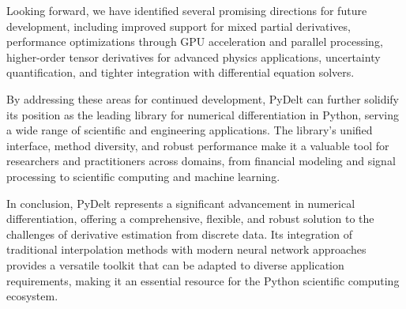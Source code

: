 \documentclass[11pt,a4paper]{article}
\begin{document}
Looking forward, we have identified several promising directions for future development, including improved support for mixed partial derivatives, performance optimizations through GPU acceleration and parallel processing, higher-order tensor derivatives for advanced physics applications, uncertainty quantification, and tighter integration with differential equation solvers.

By addressing these areas for continued development, PyDelt can further solidify its position as the leading library for numerical differentiation in Python, serving a wide range of scientific and engineering applications. The library's unified interface, method diversity, and robust performance make it a valuable tool for researchers and practitioners across domains, from financial modeling and signal processing to scientific computing and machine learning.

In conclusion, PyDelt represents a significant advancement in numerical differentiation, offering a comprehensive, flexible, and robust solution to the challenges of derivative estimation from discrete data. Its integration of traditional interpolation methods with modern neural network approaches provides a versatile toolkit that can be adapted to diverse application requirements, making it an essential resource for the Python scientific computing ecosystem.



\end{document}
